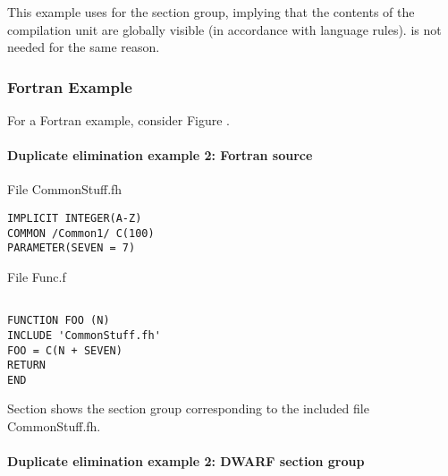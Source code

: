 This example uses  for the section group,
implying that the contents of the compilation unit are
globally visible (in accordance with 
 language rules).
 is not needed for the same reason.

\subsubsection{Fortran Example}


For a Fortran example, consider 
Figure .


\paragraph{Duplicate elimination example 2: Fortran source} 
\label{app:duplicateeliminationexample2fortransource}

File CommonStuff.fh

\begin{lstlisting}
IMPLICIT INTEGER(A-Z)
COMMON /Common1/ C(100)
PARAMETER(SEVEN = 7)
\end{lstlisting}

File Func.f
\begin{lstlisting}

FUNCTION FOO (N)
INCLUDE 'CommonStuff.fh'
FOO = C(N + SEVEN)
RETURN
END
\end{lstlisting}


Section 
shows the section group 
corresponding to the included file CommonStuff.fh.

\paragraph{Duplicate elimination example 2: DWARF section group}
\label{app:duplicateeliminationexample2dwarfsectiongroup}


